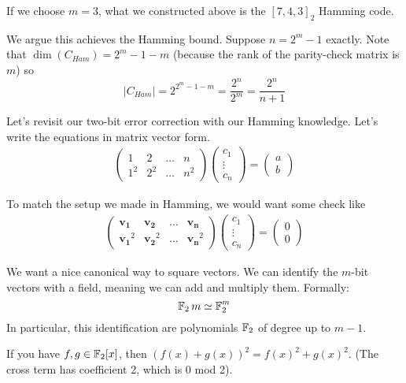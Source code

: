 If we choose $m = 3$, what we constructed above is the $[7, 4, 3]_2$ Hamming code.

We argue this achieves the Hamming bound. Suppose $n = 2^m - 1$ exactly. Note that $\dim(C_{Ham}) = 2^m - 1 - m$ (because the rank of the parity-check matrix is $m$) so 
\[ |C_{Ham}| = 2^{2^m - 1 - m} = \frac{2^n}{2^m} = \frac{2^n}{n + 1} \]

Let's revisit our two-bit error correction with our Hamming knowledge. Let's write the equations in matrix vector form.
\begin{align*}
    \begin{pmatrix}
        1 & 2 & \dots & n \\
        1^2 & 2^2 & \dots & n^2
    \end{pmatrix} \begin{pmatrix}
        c_1 \\ \vdots \\ c_n
    \end{pmatrix} = \begin{pmatrix}
        a \\ b
    \end{pmatrix}
\end{align*}

To match the setup we made in Hamming, we would want some check like
\begin{align*}
    \begin{pmatrix}
        \mathbf{v_1} & \mathbf{v_2} & \dots & \mathbf{v_n} \\
        \mathbf{v_1}^2 & \mathbf{v_2}^2 & \dots & \mathbf{v_n}^2
    \end{pmatrix} \begin{pmatrix}
        c_1 \\ \vdots \\ c_n
    \end{pmatrix} = \begin{pmatrix}
        0 \\ 0
    \end{pmatrix}
\end{align*}

We want a nice canonical way to square vectors. We can identify the $m$-bit vectors with a field, meaning we can add and multiply them.
Formally:
\[ \operatorname{\mathbb{F}}_2 m \simeq \operatorname{\mathbb{F}}_2^m \]
In particular, this identification are polynomials $\operatorname{\mathbb{F}}_2$ of degree up to $m - 1$.

\begin{note}
    If you have $f, g \in \operatorname{\mathbb{F}}_2[x]$, then $(f(x) + g(x))^2 = f(x)^2 + g(x)^2$. (The cross term has coefficient 2, which is 0 mod 2).
\end{note}

